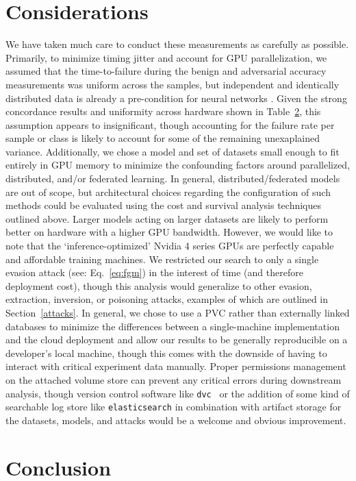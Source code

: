 \documentclass[conference]{IEEEtran}
\begin{document}
\section{Considerations}
 We have taken much care to conduct these measurements as carefully as possible. Primarily, to minimize timing jitter and account for GPU parallelization, we assumed that the time-to-failure during the benign and adversarial accuracy measurements was uniform across the samples, but independent and identically distributed data is already a pre-condition for neural networks \cite{}. Given the strong concordance results and uniformity across hardware shown in Table~\ref{}, this assumption appears to insignificant, though accounting for the failure rate per sample or class is likely to account for some of the remaining unexaplained variance. Additionally, we chose a model and set of datasets small enough to fit entirely in GPU memory to minimize the confounding factors around parallelized, distributed, and/or federated learning. In general, distributed/federated models are out of scope, but architectural choices regarding the configuration of such methods could be evaluated using the cost and survival analysis techniques outlined above. Larger models acting on larger datasets are likely to perform better on hardware with a higher GPU bandwidth. However, we would like to note that the `inference-optimized' Nvidia 4 series GPUs are perfectly capable and affordable training machines. We restricted our search to only a single evasion attack (see: Eq.~\ref{eq:fgm}) in the interest of time (and therefore deployment cost), though this analysis would generalize to other evasion, extraction, inversion, or poisoning attacks, examples of which are outlined in Section~\ref{attacks}. 
 In general, we chose to use a PVC rather than externally linked databases to minimize the differences between a single-machine implementation and the cloud deployment and allow our results to be generally reproducible on a developer's local machine, though this comes with the downside of having to interact with critical experiment data manually. Proper permissions management on the attached volume store can prevent any critical errors during downstream analysis, though version control software like \texttt{dvc}~\cite{dvc} or the addition of some kind of searchable log store like \texttt{elasticsearch}\cite{} in combination with artifact storage\cite{} for the datasets, models, and attacks would be a welcome and obvious improvement.
\section{Conclusion}



\vspace{12pt}
\end{document}
